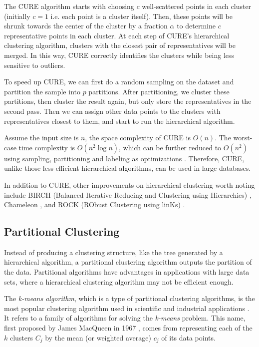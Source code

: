 \documentclass[conference]{IEEEtran}
\begin{document}
The CURE algorithm starts with choosing $c$ well-scattered points in each cluster (initially $c = 1$ i.e. each point is a cluster itself). Then, these points will be shrunk towards the center of the cluster by a fraction $\alpha$ to determine $c$ representative points in each cluster. At each step of CURE's hierarchical clustering algorithm, clusters with the closest pair of representatives will be merged. In this way, CURE correctly identifies the clusters while being less sensitive to outliers.

To speed up CURE, we can first do a random sampling on the dataset and partition the sample into $p$ partitions. After partitioning, we cluster these partitions, then cluster the result again, but only store the representatives in the second pass. Then we can assign other data points to the clusters with representatives closest to them, and start to run the hierarchical algorithm.

Assume the input size is $n$, the space complexity of CURE is $O(n)$. The worst-case time complexity is $O(n^{2}\log n)$, which can be further reduced to $O(n^{2})$ using sampling, partitioning and labeling as optimizations \cite{gan2007data}. Therefore, CURE, unlike those less-efficient hierarchical algorithms, can be used in large databases.

In addition to CURE, other improvements on hierarchical clustering worth noting include BIRCH (Balanced Iterative Reducing and Clustering using Hierarchies) \cite{zhang1996birch}, Chameleon \cite{karypis1999chameleon}, and ROCK (RObust Clustering using linKs) \cite{guha1999rock}.

\subsection{Partitional Clustering}
Instead of producing a clustering structure, like the tree generated by a hierarchical algorithm, a partitional clustering algorithm outputs the partition of the data. Partitional algorithms have advantages in applications with large data sets, where a hierarchical clustering algorithm may not be efficient enough.

The \textit{k-means algorithm}, which is a type of partitional clustering algorithms, is the most popular clustering algorithm used in scientific and industrial applications \cite{wang2006encyclopedia}. It refers to a family of algorithms for solving the \textit{k-means} problem. This name, first proposed by James MacQueen in 1967 \cite{macqueen1967some}, comes from representing each of the $k$ clusters $C_{j}$ by the mean (or weighted average) $c_{j}$ of its data points.
\end{document}
